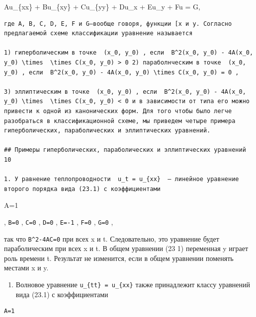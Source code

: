 \documentclass[
  ukrainian,
]{article}
\providecommand{\tightlist}{%
  \setlength{\itemsep}{0pt}\setlength{\parskip}{0pt}}
\begin{document}
Au\_\{xx\} + Bu\_\{xy\} + Cu\_\{yy\} + Du\_x + Eu\_y + Fu = G,

\begin{verbatim}
где A, B, C, D, E, F и G—вообще говоря, функции [x и y. Согласно предлагаемой схеме классификации уравнение называется

1) гиперболическим в точке  (x_0, y_0) , если  B^2(x_0, y_0) - 4A(x_0, y_0) \times  \times C(x_0, y_0) > 0 2) параболнческим в точке  (x_0, y_0) , если  B^2(x_0, y_0) - 4A(x_0, y_0) \times C(x_0, y_0) = 0 ,

3) эллиптическим в точке  (x_0, y_0) , если  B^2(x_0, y_0) - 4A(x_0, y_0) \times  \times C(x_0, y_0) < 0 и в зависимости от типа его можно привести к одной из канонических форм. Для того чтобы было легче разобраться в классификационной схеме, мы приведем четыре примера гиперболических, параболических и эллиптических уравнений.

## Примеры гиперболических, параболических и эллиптических уравнений 10

1. У равнение теплопроводности  u_t = u_{xx}  — линейное уравнение второго порядка вида (23.1) с коэффициентами
\end{verbatim}

A=1

, \texttt{B=0} , \texttt{C=0} , \texttt{D=0} , \texttt{E=-1} ,
\texttt{F=0} , \texttt{G=0} ,

так что \texttt{B\^{}2-4AC=0} при всех x и t. Следовательно, это
уравнение будет параболическим при всех x и t. В общем уравнении (23 1)
переменная y играет роль времени t. Результат не изменится, если в общем
уравнении поменять местами x и y.

\begin{enumerate}
\def\labelenumi{\arabic{enumi}.}
\setcounter{enumi}{1}
\tightlist
\item
  Волновое уравнение \texttt{u\_\{tt\}\ =\ u\_\{xx\}} также принадлежит
  классу уравнений вида (23.1) с коэффициентами
\end{enumerate}

\begin{verbatim}
A=1
\end{verbatim}
\end{document}
